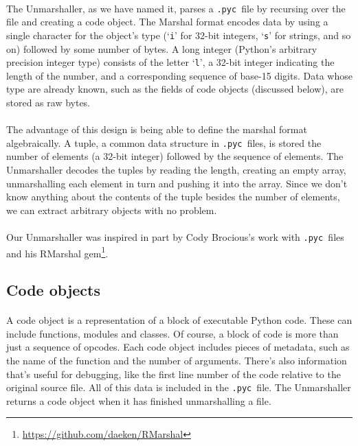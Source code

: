 \documentclass{article}
\newcommand{\pyc}{\texttt{.pyc~}}
\begin{document}
\paragraph{}
The Unmarshaller, as we have named it, parses a \pyc file by recursing over the file and creating a code object. The Marshal format encodes data by using a single character for the object's type (`\texttt{i}' for 32-bit integers, `\texttt{s}' for strings, and so on) followed by some number of bytes. A long integer (Python's arbitrary precision integer type) consists of the letter `\texttt{l}', a 32-bit integer indicating the length of the number, and a corresponding sequence of base-15 digits. Data whose type are already known, such as the fields of code objects (discussed below), are stored as raw bytes.

\paragraph{}
The advantage of this design is being able to define the marshal format algebraically. A tuple, a common data structure in \pyc files, is stored the number of elements (a 32-bit integer) followed by the sequence of elements. The Unmarshaller decodes the tuples by reading the length, creating an empty array, unmarshalling each element in turn and pushing it into the array. Since we don't know anything about the contents of the tuple besides the number of elements, we can extract arbitrary objects with no problem.

\paragraph{}
Our Unmarshaller was inspired in part by Cody Brocious's work with \pyc files and his RMarshal gem\footnote{\url{https://github.com/daeken/RMarshal}}.

\subsection{Code objects}\label{code object}

\paragraph{}
A code object is a representation of a block of executable Python code. These can include functions, modules and classes. Of course, a block of code is more than just a sequence of opcodes. Each code object includes pieces of metadata, such as the name of the function and the number of arguments. There's also information that's useful for debugging, like the first line number of the code relative to the original source file. All of this data is included in the \pyc file. The Unmarshaller returns a code object when it has finished unmarshalling a file.
\end{document}
